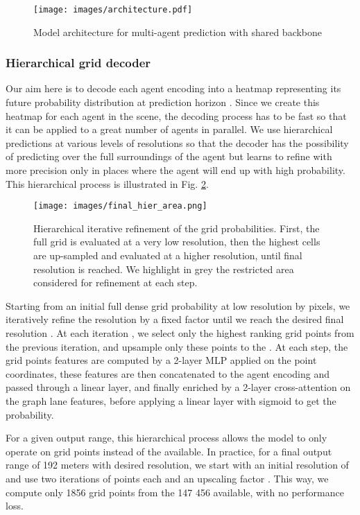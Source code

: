 \documentclass{article} \usepackage{iclr2022_conference,times}
\begin{document}
\begin{figure}[b]
\centerline{\texttt{[image: images/architecture.pdf]}}
\caption{Model architecture for multi-agent prediction with shared backbone}
\label{fig:in_out_archi}
\end{figure}

\subsubsection{Hierarchical grid decoder}

Our aim here is to decode each agent encoding into a heatmap representing its future probability distribution at prediction horizon . Since we create this heatmap for each agent in the scene, the decoding process has to be fast so that it can be applied to a great number of agents in parallel. 
We use hierarchical predictions at various levels of resolutions so that the decoder has the possibility of predicting over the full surroundings of the agent but learns to refine with more precision only in places where the agent will end up with high probability. This hierarchical process is illustrated in Fig. \ref{fig:hierarchical}.

\begin{figure}[t]
\centerline{\texttt{[image: images/final\_hier\_area.png]}}
\caption{Hierarchical iterative refinement of the grid probabilities. First, the full grid is evaluated at a very low resolution, then the highest cells are up-sampled and evaluated at a higher resolution, until final resolution is reached. We highlight in grey the restricted area considered for refinement at each step.}
\label{fig:hierarchical}
\end{figure}

Starting from an initial full dense grid probability at low resolution  by pixels, we iteratively refine the resolution by a fixed factor  until we reach the desired final resolution . At each iteration , we select only the  highest ranking grid points from the previous iteration, and upsample only these points to the . At each step, the grid points features are computed by a 2-layer MLP applied on the point coordinates, these features are then concatenated to the agent encoding and passed through a linear layer, and finally enriched by a 2-layer cross-attention on the graph lane features, before applying a linear layer with sigmoid to get the probability.

For a given  output range, this hierarchical process allows the model to only operate on
 grid points instead of the  available. In practice, for a final output range of 192 meters with desired  resolution, we start with an initial resolution of  and use two iterations of  points each and an upscaling factor . This way, we compute only 1856 grid points from the 147 456 available, with no performance loss.
\end{document}
